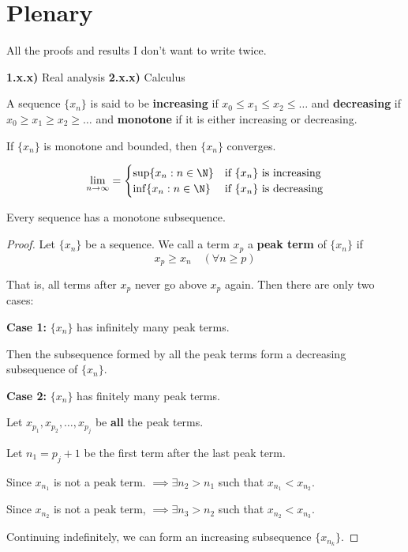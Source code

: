 
\section{Plenary}\label{80eeafc}

All the proofs and results I don't want to write twice.

\textbf{1.x.x)} Real analysis
\textbf{2.x.x)} Calculus

\label{d5142a8}

A sequence $\{x_n\}$ is said to be \textbf{increasing} if $x_0\leq
	x_1\leq x_2\leq\ldots$ and \textbf{decreasing} if $x_0\geq x_1\geq
	x_2\geq\ldots$ and \textbf{monotone} if it is either increasing or
decreasing.

\label{ca25eb7}

If $\{x_n\}$ is monotone and bounded, then $\{x_n\}$ converges.

$$
	\lim_{n\to\infty}=\begin{cases}
		\sup\{x_n:n\in\N\} & \text{if $\{x_n\}$ is increasing} \\
		\inf\{x_n:n\in\N\} & \text{if $\{x_n\}$ is decreasing}
	\end{cases}
$$

\label{dddb70e}

Every sequence has a monotone subsequence.

\begin{proof}
	\def\xn{\{x_n\}}

	Let $\xn$ be a sequence. We call a term $x_p$ a \textbf{peak term}
	of $\xn$ if
	$$x_p\geq x_n\quad(\forall n\geq p)$$

	That is, all terms after $x_p$ never go above $x_p$ again. Then
	there are only two cases:

	\textbf{Case 1:} $\xn$ has infinitely many peak terms.

	Then the subsequence formed by all the peak terms form a decreasing
	subsequence of $\xn$.

	\textbf{Case 2:} $\xn$ has finitely many peak terms.

	Let $x_{p_1},x_{p_2},\ldots,x_{p_j}$ be \textbf{all} the peak terms.

	Let $n_1=p_j+1$ be the first term after the last peak term.

	Since $x_{n_1}$ is not a peak term. $\implies\exists n_2>n_1$ such
	that $x_{n_1}<x_{n_2}$.

	Since $x_{n_2}$ is not a peak term, $\implies\exists n_3>n_2$ such
	that $x_{n_2}<x_{n_3}$.

	Continuing indefinitely, we can form an increasing subsequence
	$\{x_{n_k}\}$.
\end{proof}

